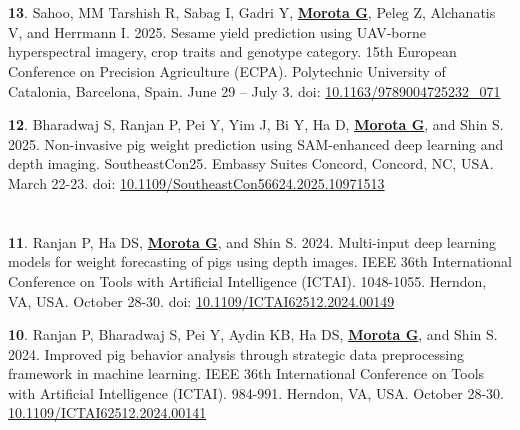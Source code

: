\documentclass[margin,line,10pt]{res}
\newenvironment{list1}{
  \begin{list}{\ding{113}}{%
      \setlength{\itemsep}{0in}
      \setlength{\parsep}{0in} \setlength{\parskip}{0in}
      \setlength{\topsep}{0in} \setlength{\partopsep}{0in} 
      \setlength{\leftmargin}{0.17in}}}{\end{list}}
\begin{document}
\begin{resume}
\section{}
\begin{list1}

  \item [{\bf 13}.]  Sahoo, MM Tarshish R, Sabag I, Gadri Y,  \textbf{\underline{Morota G}}, Peleg Z, Alchanatis V, and Herrmann I. 2025. Sesame yield prediction using UAV-borne hyperspectral imagery, crop traits and genotype category. 15th European Conference on Precision Agriculture (ECPA). Polytechnic University of Catalonia, Barcelona, Spain. June 29 – July 3. doi: \textcolor{blue}{\href{https://doi.org/10.1163/9789004725232\_071}{10.1163/9789004725232\_071}}

  \vspace{0.5cm}

  \item [{\bf 12}.]  Bharadwaj S, Ranjan P, Pei Y, Yim J, Bi Y,  Ha D, \textbf{\underline{Morota G}}, and Shin S. 2025. Non-invasive pig weight prediction using SAM-enhanced deep learning and depth imaging. SoutheastCon25. Embassy Suites Concord, Concord, NC, USA. March 22-23. doi: \textcolor{blue}{\href{https://doi.org/10.1109/SoutheastCon56624.2025.10971513}{10.1109/SoutheastCon56624.2025.10971513}}

\end{list1}



\section{}
\begin{list1}


  \item [{\bf 11}.] Ranjan P, Ha DS, \textbf{\underline{Morota G}}, and Shin S. 2024. Multi-input deep learning models for weight forecasting of pigs using depth images. IEEE 36th International Conference on Tools with Artificial Intelligence (ICTAI). 1048-1055. Herndon, VA, USA. October 28-30. doi: \textcolor{blue}{\href{https://doi.org/10.1109/ICTAI62512.2024.00149}{10.1109/ICTAI62512.2024.00149}}

  \vspace{0.5cm}


  \item [{\bf 10}.] Ranjan P, Bharadwaj S, Pei Y, Aydin KB, Ha DS, \textbf{\underline{Morota G}}, and Shin S. 2024. Improved pig behavior analysis through strategic data preprocessing framework in machine learning. IEEE 36th International Conference on Tools with Artificial Intelligence (ICTAI). 984-991. Herndon, VA, USA. October 28-30. \textcolor{blue}{\href{https://doi.org/10.1109/ICTAI62512.2024.00141}{10.1109/ICTAI62512.2024.00141}}



\end{list1}
\end{resume}
\end{document}
